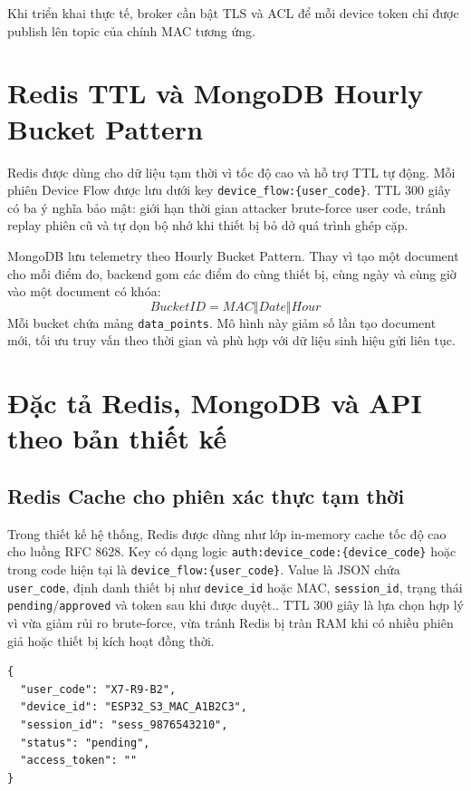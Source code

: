 \documentclass[a4paper,13pt,3p,oneside]{report}
\begin{document}
Khi triển khai thực tế, broker cần bật TLS và ACL để mỗi device token chỉ được publish lên topic của chính MAC tương ứng.

\section{Redis TTL và MongoDB Hourly Bucket Pattern}
Redis được dùng cho dữ liệu tạm thời vì tốc độ cao và hỗ trợ TTL tự động. Mỗi phiên Device Flow được lưu dưới key \texttt{device\_flow:\{user\_code\}}. TTL 300 giây có ba ý nghĩa bảo mật: giới hạn thời gian attacker brute-force user code, tránh replay phiên cũ và tự dọn bộ nhớ khi thiết bị bỏ dở quá trình ghép cặp.

MongoDB lưu telemetry theo Hourly Bucket Pattern. Thay vì tạo một document cho mỗi điểm đo, backend gom các điểm đo cùng thiết bị, cùng ngày và cùng giờ vào một document có khóa:
\begin{equation}
BucketID = MAC \Vert Date \Vert Hour
\end{equation}
Mỗi bucket chứa mảng \texttt{data\_points}. Mô hình này giảm số lần tạo document mới, tối ưu truy vấn theo thời gian và phù hợp với dữ liệu sinh hiệu gửi liên tục.

\section{Đặc tả Redis, MongoDB và API theo bản thiết kế}
\subsection{Redis Cache cho phiên xác thực tạm thời}
Trong thiết kế hệ thống, Redis được dùng như lớp in-memory cache tốc độ cao cho luồng RFC 8628. Key có dạng logic \texttt{auth:device\_code:\{device\_code\}} hoặc trong code hiện tại là \texttt{device\_flow:\{user\_code\}}. Value là JSON chứa \texttt{user\_code}, định danh thiết bị như \texttt{device\_id} hoặc MAC, \texttt{session\_id}, trạng thái \texttt{pending}/\texttt{approved} và token sau khi được duyệt.. TTL 300 giây là lựa chọn hợp lý vì vừa giảm rủi ro brute-force, vừa tránh Redis bị tràn RAM khi có nhiều phiên giả hoặc thiết bị kích hoạt đồng thời.

\begin{lstlisting}
{
  "user_code": "X7-R9-B2",
  "device_id": "ESP32_S3_MAC_A1B2C3",
  "session_id": "sess_9876543210",
  "status": "pending",
  "access_token": ""
}
\end{lstlisting}
\end{document}
